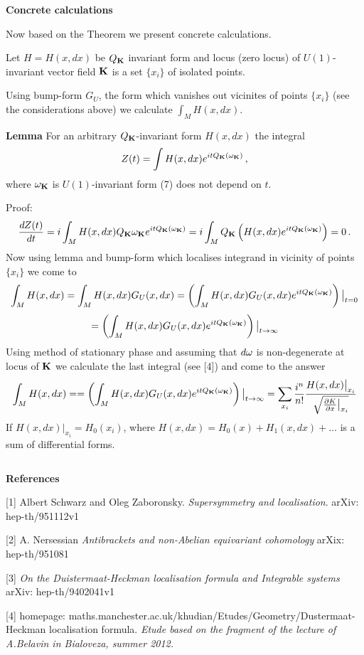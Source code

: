 \m

\centerline {\bf Concrete calculations}

   Now based on the Theorem we present concrete calculations.

Let $H=H(x,dx)$ be $Q_{\bf K}$ invariant form and 
locus (zero locus)
of $U(1)$-invariant 
vector field ${\bf K}$ is a set $\{x_i\}$ of isolated points.

Using bump-form $G_U$, the form which vanishes out vicinites of
points $\{x_i\}$ (see the considerations above) we calculate
$\int_M H(x,dx)$.


 {\bf Lemma}  For an arbitrary $Q_{\bf K}$-invariant form $H(x,dx)$ the integral
            $$
   Z(t)=\int H(x,dx)e^{itQ_{\bf K}({\omega}_{\bf K})}\,, 
            $$
where ${\omega}_{\bf K}$ is $U(1)$-invariant form 
(7) does not depend on $t$.

  Proof:
              $$
 {dZ(t)\over dt}=
           i\int_M 
  H(x,dx)Q_{\bf K}
   {\omega}_{\bf K}
  e^{itQ_{\bf K}({\omega}_{\bf K})}=
    i\int_M Q_{\bf K}
          \left(
  H(x,dx)e^{itQ_{\bf K}({\omega}_{\bf K})}
          \right)=0\,.
              $$
Now using lemma and bump-form which localises integrand in vicinity of
points $\{x_i\}$ we come to 
           $$
\int_M H(x,dx)=\int_M H(x,dx)G_U(x,dx)=
\left(
\int_M H(x,dx)G_U(x,dx)e^{itQ_{\bf K}({\omega}_{\bf K})}\right)
\big\vert_{t=0}
             $$
             $$
              =
\left(\int_M H(x,dx)G_U(x,dx)e^{itQ_{\bf K}({\omega}_{\bf K})}\right)
\big\vert_{t\to\infty}
           $$ 
Using method of stationary phase and assuming that $d{\omega}$ is non-degenerate
at locus of ${\bf K}$  we calculate the last integral
(see [4]) and come to the answer
           $$
\int_M H(x,dx)=
              =
\left(\int_M H(x,dx)G_U(x,dx)e^{itQ_{\bf K}({\omega}_{\bf K})}\right)
\big\vert_{t\to\infty}=
\sum_{x_i}{i^n\over n!}{H(x,dx)\big\vert_{x_i}\over 
  \sqrt  {{\partial K\over \partial x}\big\vert_{x_i}} }
           $$ 
If $H(x,dx)\big\vert_{x_i}=H_0(x_i)$, where
$H(x,dx)=H_0(x)+H_1(x,dx)+\dots$ is a sum of differential forms. 
 

$$ $$

\centerline {\bf References}

 [1] Albert Schwarz and Oleg Zaboronsky. 
 {\it Supersymmetry and localisation}. arXiv: hep-th/951112v1

  \m

 [2]  A. Nersessian {\it Antibrackets and non-Abelian 
     equivariant cohomology}
   arXix: hep-th/951081

\m
        
 [3] {\it On the Duistermaat-Heckman localisation 
 formula and Integrable systems} 
arXiv: hep-th/9402041v1

\m


 [4] homepage: maths.manchester.ac.uk/khudian/Etudes/Geometry/Dustermaat-Heckman  localisation formula. 
{\it Etude based on the fragment of the lecture of 
A.Belavin in Bialoveza, summer 2012.} 

\bye
